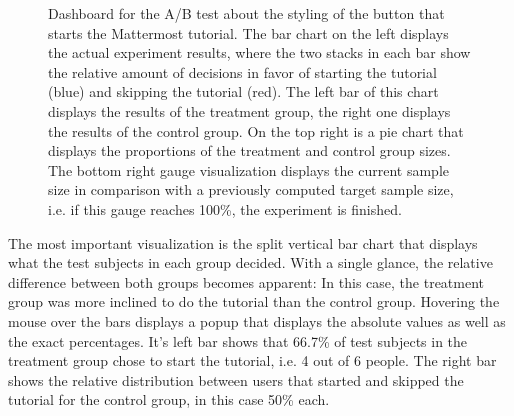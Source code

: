 \begin{figure}[t]
        \caption[Dashboard for the A/B test about the styling of the button that starts the Mattermost tutorial.]{
        Dashboard for the A/B test about the styling of the button that starts the Mattermost tutorial.
        The bar chart on the left displays the actual experiment results, where the two stacks in each bar show the relative amount of decisions in favor of starting the tutorial (blue) and skipping the tutorial (red).
        The left bar of this chart displays the results of the treatment group, the right one displays the results of the control group.
        On the top right is a pie chart that displays the proportions of the treatment and control group sizes.
        The bottom right gauge visualization displays the current sample size in comparison with a previously computed target sample size, i.e. if this gauge reaches 100\%, the experiment is finished.}
        \label{figure:evaluation:user:dashboard-ab-test}
\end{figure}

The most important visualization is the split vertical bar chart that displays what the test subjects in each group decided.
With a single glance, the relative difference between both groups becomes apparent: In this case, the treatment group was more inclined to do the tutorial than the control group.
Hovering the mouse over the bars displays a popup that displays the absolute values as well as the exact percentages.
It's left bar shows that 66.7\% of test subjects in the treatment group chose to start the tutorial, i.e. 4 out of 6 people.
The right bar shows the relative distribution between users that started and skipped the tutorial for the control group, in this case 50\% each.

